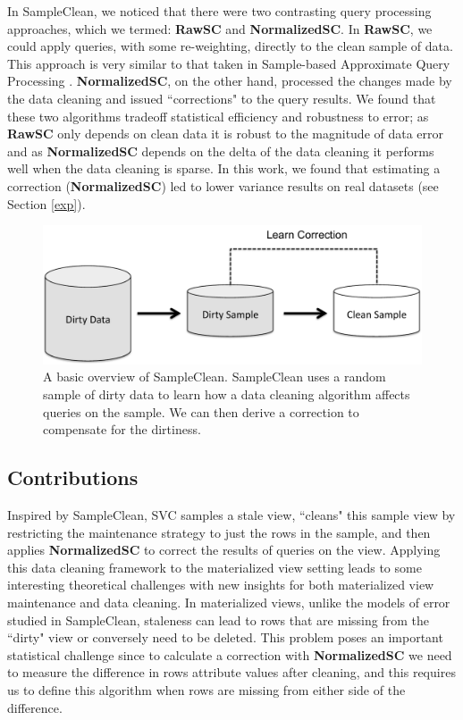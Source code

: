In SampleClean, we noticed that there were two contrasting query processing approaches, which we termed: \textbf{RawSC} and \textbf{NormalizedSC}.
In \textbf{RawSC}, we could apply queries, with some re-weighting, directly to the clean sample of data.
This approach is very similar to that taken in Sample-based Approximate Query Processing \cite{OlkenR86,AgarwalMPMMS13, joshi2008materialized}.
\textbf{NormalizedSC}, on the other hand, processed the changes made by the data cleaning and issued ``corrections" to the query results.
We found that these two algorithms tradeoff statistical efficiency and robustness to error; as \textbf{RawSC} only depends on clean data it is robust to the magnitude of data error and as \textbf{NormalizedSC} depends on the delta of the data cleaning it performs well when the data cleaning is sparse. 
In this work, we found that estimating a correction (\textbf{NormalizedSC}) led to lower variance results on real datasets (see Section \ref{exp}). 

\begin{figure}[t] \vspace{-2em}
\centering
 \includegraphics[scale=0.30]{figs/sys-arch2.pdf} \vspace{-.25em}
 \caption{A basic overview of SampleClean. SampleClean uses a random sample of dirty data to learn how a data cleaning algorithm affects queries on the sample. We can then derive a correction to compensate for the dirtiness. \label{sc}}\vspace{-1.75em}
\end{figure}

\subsection{Contributions}
Inspired by SampleClean, SVC samples a stale view, ``cleans" this sample view by restricting the maintenance strategy to just the rows in the sample, and then applies \textbf{NormalizedSC} to correct the results of queries on the view.
Applying this data cleaning framework to the materialized view setting leads to some interesting theoretical challenges with new insights for both materialized view maintenance and data cleaning.
In materialized views, unlike the models of error studied in SampleClean, staleness can lead to rows that are missing from the ``dirty" view or conversely need to be deleted.
This problem poses an important statistical challenge since to calculate a correction with \textbf{NormalizedSC} we need to measure the difference in rows attribute values after cleaning, and this requires us to define this algorithm when rows are missing from either side of the difference.

